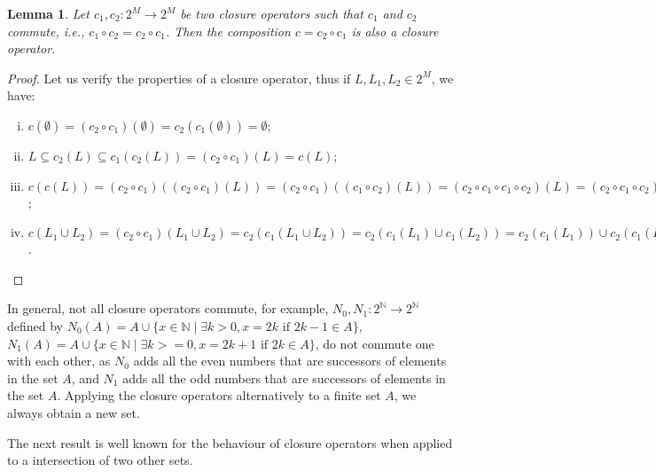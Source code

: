 \documentclass{article}
\newtheorem{lemma}{Lemma}
\newcommand{\N}{{\mathbb N}}
\begin{document}
\begin{lemma}
\label{lcomute}
Let  $c_1,c_2:2^M\longrightarrow 2^M$ be
two closure operators such that $c_1$ and $c_2$ commute, i.e.,
$c_1\circ c_2=c_2 \circ c_1$.
Then the composition $c=c_2\circ c_1$ is also a closure operator.  
\end{lemma}
\begin{proof}
Let us verify the properties of a closure operator, thus if 
$L,L_1,L_2\in 2^M$, we have:
\begin{enumerate}[i)]
\item $c(\emptyset)=(c_2\circ c_1)(\emptyset)=c_2(c_1(\emptyset))=\emptyset$;
\item $L\subseteq c_2(L)\subseteq c_1(c_2(L))=(c_2\circ c_1)(L)=c(L)$;
\item $c(c(L))=(c_2\circ c_1)((c_2\circ c_1)(L))=
       (c_2\circ c_1)((c_1\circ c_2)(L))=
       (c_2\circ c_1\circ c_1\circ c_2)(L)=
       (c_2\circ c_1\circ c_2)(L)=
       (c_2\circ c_2\circ c_1)(L)=
       (c_2\circ c_1)(L)=c(L)$;
\item $c(L_1\cup L_2)=(c_2\circ c_1)(L_1\cup L_2)=
c_2(c_1(L_1\cup L_2))=
c_2(c_1(L_1)\cup c_1(L_2))=
c_2(c_1(L_1))\cup c_2(c_1(L_2))=
c(L_1)\cup c(L_2)$. 
\end{enumerate}
\end{proof}

In general, not all closure operators commute, for example, 
$N_0,N_1:2^\N\longrightarrow2^\N$ defined by 
$N_0(A)=A\cup \{x\in \N\mid  \exists k>0, x=2k\mbox{ if }2k-1\in A\}$,
$N_1(A)=A\cup \{x\in \N\mid  \exists k>=0, x=2k+1\mbox{ if }2k\in A\}$,
do not commute one with each other, as $N_0$ adds all the even numbers that
are successors of elements in the set $A$, and $N_1$  adds all the odd numbers
that are successors of elements in the set $A$. 
Applying the closure operators alternatively to a finite set $A$, 
we always obtain a new set. 

The next result is well known for the behaviour of closure operators when applied 
to a intersection of two other sets.
\end{document}
